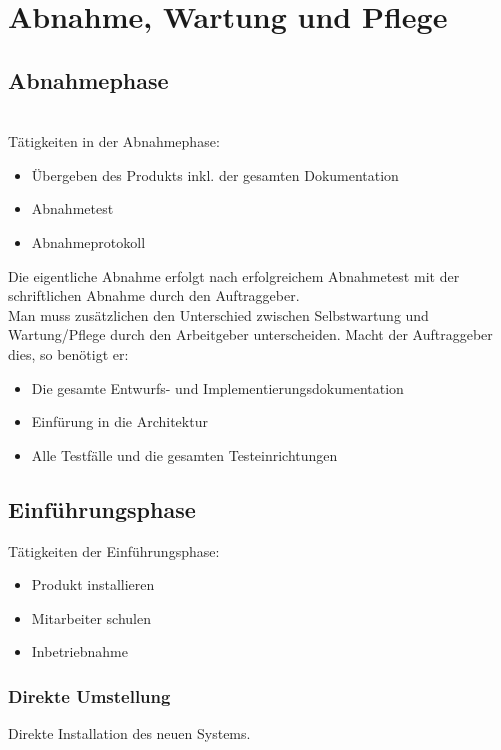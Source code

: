 \section{Abnahme, Wartung und Pflege}
\subsection{Abnahmephase}
\\
Tätigkeiten in der Abnahmephase:
\begin{itemize}
    \item Übergeben des Produkts inkl. der gesamten Dokumentation
    \item Abnahmetest
    \item Abnahmeprotokoll
\end{itemize}

Die eigentliche Abnahme erfolgt nach erfolgreichem Abnahmetest mit der schriftlichen Abnahme durch den Auftraggeber.
\\
Man muss zusätzlichen den Unterschied zwischen Selbstwartung und Wartung/Pflege durch den Arbeitgeber unterscheiden. Macht der Auftraggeber dies, so benötigt er:
\begin{itemize}
    \item Die gesamte Entwurfs- und Implementierungsdokumentation
    \item Einfürung in die Architektur
    \item Alle Testfälle und die gesamten Testeinrichtungen
\end{itemize}

\subsection{Einführungsphase}
Tätigkeiten der Einführungsphase:
\begin{itemize}
    \item Produkt installieren
    \item Mitarbeiter schulen
    \item Inbetriebnahme
\end{itemize}

\subsubsection{Direkte Umstellung}
Direkte Installation des neuen Systems.

